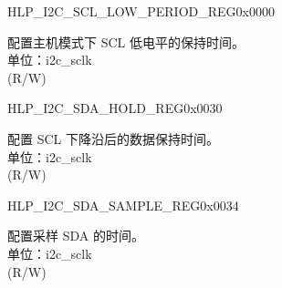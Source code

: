 \begin{register}{H}{LP\_I2C\_SCL\_LOW\_PERIOD\_REG}{0x0000}\label{regdesc:LPI2CSCLLOWPERIODREG}
%
%
\regnewline%
\begin{regdesc}\begin{reglist}
\label{fielddesc:LPI2CSCLLOWPERIOD}\item [LP\_I2C\_SCL\_LOW\_PERIOD] 配置主机模式下 SCL 低电平的保持时间。\\
单位：i2c\_sclk \\ (R/W)
\end{reglist}\end{regdesc}
\end{register}


\begin{register}{H}{LP\_I2C\_SDA\_HOLD\_REG}{0x0030}\label{regdesc:LPI2CSDAHOLDREG}
%
%
\regnewline%
\begin{regdesc}\begin{reglist}
\label{fielddesc:LPI2CSDAHOLDTIME}\item [LP\_I2C\_SDA\_HOLD\_TIME] 配置 SCL 下降沿后的数据保持时间。\\
单位：i2c\_sclk \\ (R/W)
\end{reglist}\end{regdesc}
\end{register}


\begin{register}{H}{LP\_I2C\_SDA\_SAMPLE\_REG}{0x0034}\label{regdesc:LPI2CSDASAMPLEREG}
%
%
\regnewline%
\begin{regdesc}\begin{reglist}
\label{fielddesc:LPI2CSDASAMPLETIME}\item [LP\_I2C\_SDA\_SAMPLE\_TIME] 配置采样 SDA 的时间。\\
单位：i2c\_sclk \\ (R/W)
\end{reglist}\end{regdesc}
\end{register}


